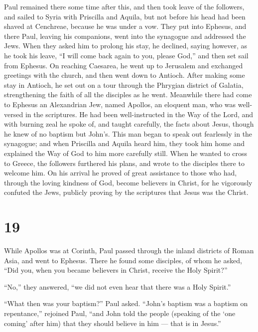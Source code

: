  Paul remained there some time after this, and then took
leave of the followers, and sailed to Syria with Priscilla and Aquila,
but not before his head had been shaved at Cenchreae, because he was
under a vow.  They put into Ephesus, and there Paul,
leaving his companions, went into the synagogue and addressed the Jews.
 When they asked him to prolong his stay, he declined,
saying however,  as he took his leave, ``I will come back
again to you, please God,'' and then set sail from Ephesus.
 On reaching Caesarea, he went up to Jerusalem and
exchanged greetings with the church, and then went down to Antioch.
 After making some stay in Antioch, he set out on a tour
through the Phrygian district of Galatia, strengthening the faith of all
the disciples as he went.  Meanwhile there had come to
Ephesus an Alexandrian Jew, named Apollos, an eloquent man, who was
well-versed in the scriptures.  He had been well-instructed
in the Way of the Lord, and with burning zeal he spoke of, and taught
carefully, the facts about Jesus, though he knew of no baptism but
John's.  This man began to speak out fearlessly in the
synagogue; and when Priscilla and Aquila heard him, they took him home
and explained the Way of God to him more carefully still. 
When he wanted to cross to Greece, the followers furthered his plans,
and wrote to the disciples there to welcome him. On his arrival he
proved of great assistance to those who had, through the loving kindness
of God, become believers in Christ,  for he vigorously
confuted the Jews, publicly proving by the scriptures that Jesus was the
Christ.

\hypertarget{section-18}{%
\section{19}\label{section-18}}

 While Apollos was at Corinth, Paul passed through the
inland districts of Roman Asia, and went to Ephesus. There he found some
disciples, of whom he asked,  ``Did you, when you became
believers in Christ, receive the Holy Spirit?''

``No,'' they answered, ``we did not even hear that there was a Holy
Spirit.''

 ``What then was your baptism?'' Paul asked. 
``John's baptism was a baptism on repentance,'' rejoined Paul, ``and
John told the people (speaking of the `one coming' after him) that they
should believe in him --- that is in Jesus.''


